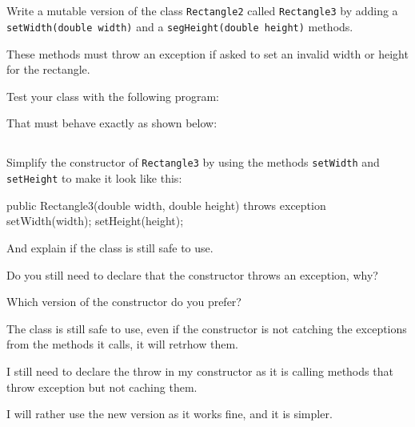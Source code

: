 \documentclass[a4paper, 11pt]{article}
\begin{document}
\subsection{}

Write a mutable version of the class \verb+Rectangle2+ called \verb+Rectangle3+
by adding a \verb+setWidth(double width)+ and a \verb+segHeight(double height)+
methods.

These methods must throw an exception if asked to set an invalid width or height
for the rectangle.

Test your class with the following program:


That must behave exactly as shown below:




\subsection{}

Simplify the constructor of \verb+Rectangle3+ by using the methods
\verb+setWidth+ and \verb+setHeight+ to make it look like this:

\begin{blackboard}
public Rectangle3(double width, double height) throws exception {
    setWidth(width);
    setHeight(height);
}
\end{blackboard}

And explain if the class is still safe to use.

Do you still need to declare that the constructor throws an exception, why?

Which version of the constructor do you prefer?

\begin{solution}
The class is still safe to use, even if the constructor is not catching
the exceptions from the methods it calls, it will retrhow them.

I still need to declare the throw in my constructor as it is calling methods
that throw exception but not caching them.

I will rather use the new version as it works fine, and it is simpler.
\end{solution}
\end{document}
